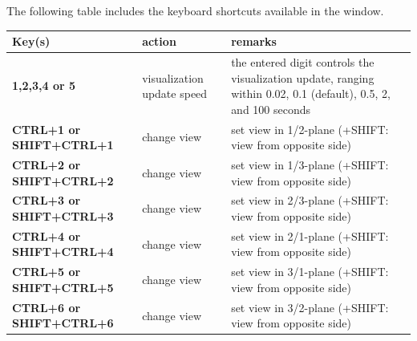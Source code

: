 The following table includes the keyboard shortcuts available in the window. 

\begin{center}
  \footnotesize
  \begin{longtable}{| p{4cm} | p{4cm} | p{8cm} |} 
	\hline
  \bf Key(s) & action & \bf remarks \\ \hline
  \bf 1,2,3,4 or 5 & visualization update speed & the entered digit controls the visualization update, ranging within 0.02, 0.1 (default), 0.5, 2, and 100 seconds \\ \hline
  \bf CTRL+1 or SHIFT+CTRL+1& change view& set view in 1/2-plane (+SHIFT: view from opposite side) \\ \hline
  \bf CTRL+2 or SHIFT+CTRL+2& change view& set view in 1/3-plane (+SHIFT: view from opposite side) \\ \hline
  \bf CTRL+3 or SHIFT+CTRL+3& change view& set view in 2/3-plane (+SHIFT: view from opposite side) \\ \hline
  \bf CTRL+4 or SHIFT+CTRL+4& change view& set view in 2/1-plane (+SHIFT: view from opposite side) \\ \hline
  \bf CTRL+5 or SHIFT+CTRL+5& change view& set view in 3/1-plane (+SHIFT: view from opposite side) \\ \hline
  \bf CTRL+6 or SHIFT+CTRL+6& change view& set view in 3/2-plane (+SHIFT: view from opposite side) \\ \hline


\end{longtable}
\end{center}
